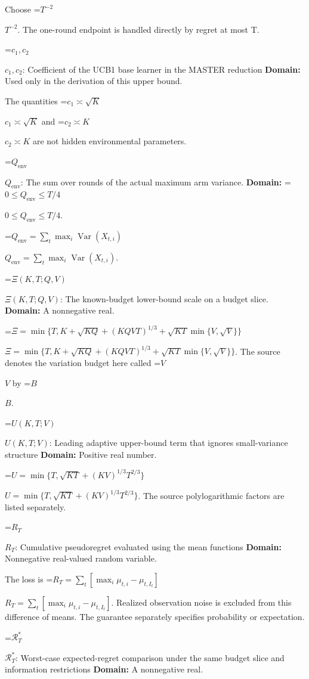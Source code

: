 \documentclass[10pt,a4paper]{article}
\newcommand{\AtlasMath}[1]{\par\begingroup\centering\setbox0=\hbox{$\displaystyle #1$}\ifdim\wd0>1.4\linewidth\typeout{ATLAS WIDE FORMULA: \the\wd0}\fi\ifdim\wd0>\linewidth\resizebox{\linewidth}{!}{\box0}\else\box0\fi\par\endgroup}
\newcommand{\AtlasInlineMath}[1]{\begingroup\setbox0=\hbox{$#1$}\ifdim\wd0>.4\linewidth\endgroup\AtlasMath{#1}\else\endgroup$#1$\fi}
\begin{document}
Choose \AtlasInlineMath{T^{-2}}. The one-round endpoint is handled directly by regret at most T.



\AtlasInlineMath{c_1,c_2}: Coefficient of the UCB1 base learner in the MASTER reduction \textbf{Domain:} Used only in the derivation of this upper bound.



The quantities \AtlasInlineMath{c_1\asymp\sqrt K} and \AtlasInlineMath{c_2\asymp K} are not hidden environmental parameters.



\AtlasInlineMath{Q_{\mathrm{env}}}: The sum over rounds of the actual maximum arm variance. \textbf{Domain:} \AtlasInlineMath{0\le Q_{\mathrm{env}}\le T/4}.



\AtlasInlineMath{Q_{\mathrm{env}}=\sum_t\max_i\operatorname{Var}(X_{t,i})}.



\AtlasInlineMath{\Xi(K,T;Q,V)}: The known-budget lower-bound scale on a budget slice. \textbf{Domain:} A nonnegative real.



\AtlasInlineMath{\Xi=\min\{T,K+\sqrt{KQ}+(KQVT)^{1/3}+\sqrt{KT}\min\{V,\sqrt V\}\}}. The source denotes the variation budget here called \AtlasInlineMath{V} by \AtlasInlineMath{B}.



\AtlasInlineMath{U(K,T;V)}: Leading adaptive upper-bound term that ignores small-variance structure \textbf{Domain:} Positive real number.



\AtlasInlineMath{U=\min\{T,\sqrt{KT}+(KV)^{1/3}T^{2/3}\}}. The source polylogarithmic factors are listed separately.



\AtlasInlineMath{R_T}: Cumulative pseudoregret evaluated using the mean functions \textbf{Domain:} Nonnegative real-valued random variable.



The loss is \AtlasInlineMath{R_T=\sum_t[\max_i\mu_{t,i}-\mu_{t,I_t}]}. Realized observation noise is excluded from this difference of means. The guarantee separately specifies probability or expectation.



\AtlasInlineMath{\mathcal R_T^*}: Worst-case expected-regret comparison under the same budget slice and information restrictions \textbf{Domain:} A nonnegative real.
\end{document}
